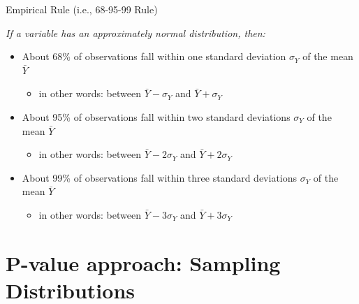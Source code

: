 \documentclass[
  8pt,
  ignorenonframetext,
  dvipsnames]{beamer}
\providecommand{\tightlist}{%
  \setlength{\itemsep}{0pt}\setlength{\parskip}{0pt}}
\let\olditem\item
\renewcommand{\item}{%
  \olditem\vspace{4pt}
}
\begin{document}
\begin{frame}{Empirical Rule (i.e., 68-95-99 Rule)}
\protect\hypertarget{empirical-rule-i.e.-68-95-99-rule}{}

\emph{If a variable has an approximately normal distribution, then:}

\medskip

\begin{itemize}
\tightlist
\item
  About 68\% of observations fall within one standard deviation
  \(\sigma_Y\) of the mean \(\bar{Y}\)

  \begin{itemize}
  \tightlist
  \item
    in other words: between \(\bar{Y} - \sigma_Y\) and
    \(\bar{Y} + \sigma_Y\)
  \end{itemize}
\end{itemize}

\medskip

\begin{itemize}
\tightlist
\item
  About 95\% of observations fall within two standard deviations
  \(\sigma_Y\) of the mean \(\bar{Y}\)

  \begin{itemize}
  \tightlist
  \item
    in other words: between \(\bar{Y} - 2\sigma_Y\) and
    \(\bar{Y} + 2\sigma_Y\)
  \end{itemize}
\end{itemize}

\medskip

\begin{itemize}
\tightlist
\item
  About 99\% of observations fall within three standard deviations
  \(\sigma_Y\) of the mean \(\bar{Y}\)

  \begin{itemize}
  \tightlist
  \item
    in other words: between \(\bar{Y} - 3\sigma_Y\) and
    \(\bar{Y} + 3\sigma_Y\)
  \end{itemize}
\end{itemize}

\end{frame}

\hypertarget{p-value-approach-sampling-distributions}{%
\section{P-value approach: Sampling
Distributions}\label{p-value-approach-sampling-distributions}}
\end{document}
